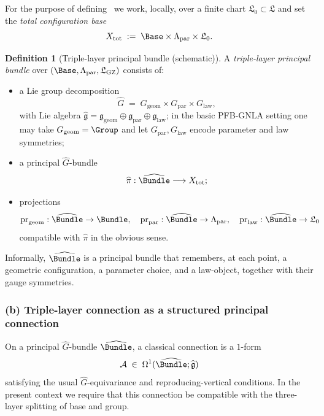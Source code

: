 \documentclass[11pt]{book}
\theoremstyle{plain}
\theoremstyle{definition}
\newtheorem{definition}[theorem]{Definition} \theoremstyle{remark}
\newcommand{\GZLS}{\ensuremath{\mathfrak{L}_{\mathrm{GZ}}}}       \newcommand{\GZLT}{\ensuremath{M_{!w}}}                           \newcommand{\GZLOC}{\ensuremath{A_M}}                             \newcommand{\GZLCurv}{\ensuremath{\mathcal{F}_{\mathrm{law}}}}
\begin{document}
For the purpose of defining \GZTLC\ we work, locally, over a finite
chart $\mathfrak{L}_0\subset\mathfrak{L}$ and set the \emph{total
configuration base}
\[
   X_{\mathrm{tot}}
   \;:=\;
   \Base \times \Lambda_{\mathrm{par}} \times \mathfrak{L}_0.
\]



\begin{definition}[Triple-layer principal bundle (schematic)]
  A \emph{triple-layer principal bundle} over
  $(\Base,\Lambda_{\mathrm{par}},\GZLS)$ consists of:
  \begin{itemize}
    \item a Lie group decomposition
          \[
             \widehat{G}
             \;=\;
             G_{\mathrm{geom}}\times G_{\mathrm{par}}\times G_{\mathrm{law}},
          \]
          with Lie algebra
          $\widehat{\mathfrak{g}}
           = \mathfrak{g}_{\mathrm{geom}}
             \oplus\mathfrak{g}_{\mathrm{par}}
             \oplus\mathfrak{g}_{\mathrm{law}}$;
          in the basic PFB-GNLA setting one may take
          $G_{\mathrm{geom}}=\Group$ and let
          $G_{\mathrm{par}},G_{\mathrm{law}}$ encode parameter and
          law symmetries;
    \item a principal $\widehat{G}$-bundle
          \[
              \widehat{\pi}:\widehat{\Bundle}\longrightarrow X_{\mathrm{tot}};
          \]
    \item projections
          \[
             \mathrm{pr}_{\mathrm{geom}}:
             \widehat{\Bundle}\to\Bundle,\quad
             \mathrm{pr}_{\mathrm{par}}:
             \widehat{\Bundle}\to\Lambda_{\mathrm{par}},\quad
             \mathrm{pr}_{\mathrm{law}}:
             \widehat{\Bundle}\to\mathfrak{L}_0
          \]
          compatible with $\widehat{\pi}$ in the obvious sense.
  \end{itemize}
\end{definition}

Informally, $\widehat{\Bundle}$ is a principal bundle that remembers, at
each point, a geometric configuration, a parameter choice, and a
law-object, together with their gauge symmetries.



\subsubsection*{(b) Triple-layer connection as a structured principal connection}

On a principal $\widehat{G}$-bundle $\widehat{\Bundle}$, a classical
connection is a $1$-form
\[
  \mathcal{A}
  \;\in\;
  \Omega^1(\widehat{\Bundle};\widehat{\mathfrak{g}})
\]
satisfying the usual $\widehat{G}$-equivariance and reproducing-vertical
conditions. In the present context we require that this connection be
compatible with the three-layer splitting of base and group.
\end{document}
